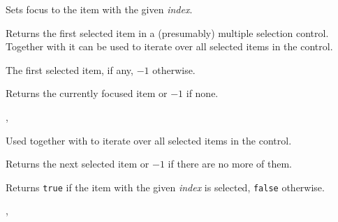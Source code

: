


\label{wxlistviewfocus}


Sets focus to the item with the given {\it index}.


\label{wxlistviewgetfirstselected}


Returns the first selected item in a (presumably) multiple selection control.
Together with  it can be
used to iterate over all selected items in the control.


The first selected item, if any, $-1$ otherwise.


\label{wxlistviewgetfocuseditem}


Returns the currently focused item or $-1$ if none.


,\\


\label{wxlistviewgetnextselected}


Used together with  to
iterate over all selected items in the control.


Returns the next selected item or $-1$ if there are no more of them.


\label{wxlistviewisselected}


Returns {\tt true} if the item with the given {\it index} is selected, 
{\tt false} otherwise.


,\\


